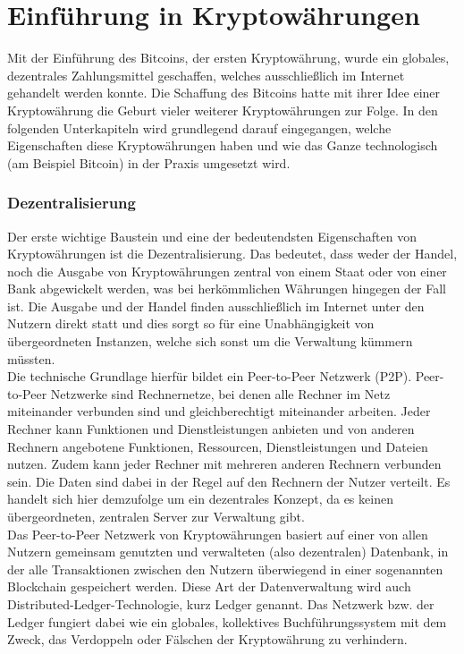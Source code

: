 \documentclass[12pt]{article}
\begin{document}
\part{Einführung in Kryptowährungen}
Mit der Einführung des Bitcoins, der ersten Kryptowährung, wurde ein globales, dezentrales Zahlungsmittel geschaffen, welches ausschließlich im Internet gehandelt werden konnte. Die Schaffung des Bitcoins hatte mit ihrer Idee einer Kryptowährung die Geburt vieler weiterer Kryptowährungen zur Folge. In den folgenden Unterkapiteln wird grundlegend darauf eingegangen, welche Eigenschaften diese Kryptowährungen haben und wie das Ganze technologisch (am Beispiel Bitcoin) in der Praxis umgesetzt wird.

\section{Dezentralisierung}
Der erste wichtige Baustein und eine der bedeutendsten Eigenschaften von Kryptowährungen ist die Dezentralisierung. Das bedeutet, dass weder der Handel, noch die Ausgabe von Kryptowährungen zentral von einem Staat oder von einer Bank abgewickelt werden, was bei herkömmlichen Währungen hingegen der Fall ist. Die Ausgabe und der Handel finden ausschließlich im Internet unter den Nutzern direkt statt und dies sorgt so für eine Unabhängigkeit von übergeordneten Instanzen, welche sich sonst um die Verwaltung kümmern müssten.\\
Die technische Grundlage hierfür bildet ein Peer-to-Peer Netzwerk (P2P). Peer-to-Peer Netzwerke sind Rechnernetze, bei denen alle Rechner im Netz miteinander verbunden sind und gleichberechtigt miteinander arbeiten. Jeder Rechner kann Funktionen und Dienstleistungen anbieten und von anderen Rechnern angebotene Funktionen, Ressourcen, Dienstleistungen und Dateien nutzen. Zudem kann jeder Rechner mit mehreren anderen Rechnern verbunden sein. Die Daten sind dabei in der Regel auf den Rechnern der Nutzer verteilt. Es handelt sich hier demzufolge um ein dezentrales Konzept, da es keinen übergeordneten, zentralen Server zur Verwaltung gibt.\\
Das Peer-to-Peer Netzwerk von Kryptowährungen basiert auf einer von allen Nutzern gemeinsam genutzten und verwalteten (also dezentralen) Datenbank, in der alle Transaktionen zwischen den Nutzern überwiegend in einer sogenannten Blockchain gespeichert werden. Diese Art der Datenverwaltung wird auch Distributed-Ledger-Technologie, kurz Ledger genannt. Das Netzwerk bzw. der Ledger fungiert dabei wie ein globales, kollektives Buchführungssystem mit dem Zweck, das Verdoppeln oder Fälschen der Kryptowährung zu verhindern.\\
\end{document}

